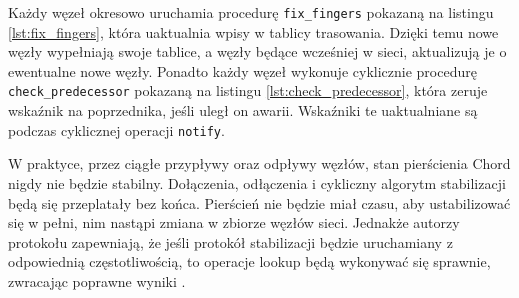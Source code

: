 \documentclass[12pt, twoside, openany]{report}
\begin{document}












Każdy węzeł okresowo uruchamia procedurę \texttt{fix\_fingers} pokazaną na listingu \ref{lst:fix_fingers}, która uaktualnia wpisy w tablicy trasowania. Dzięki temu nowe węzły wypełniają swoje tablice, a węzły będące wcześniej w sieci, aktualizują je o ewentualne nowe węzły. Ponadto każdy węzeł wykonuje cyklicznie procedurę \\\texttt{check\_predecessor} pokazaną na listingu \ref{lst:check_predecessor}, która zeruje wskaźnik na poprzednika, jeśli uległ on awarii. Wskaźniki te uaktualniane są podczas cyklicznej operacji \texttt{notify}.

W praktyce, przez ciągłe przypływy oraz odpływy węzłów, stan pierścienia Chord nigdy nie będzie stabilny. Dołączenia, odłączenia i cykliczny algorytm stabilizacji będą się przeplatały bez końca. Pierścień nie będzie miał czasu, aby ustabilizować się w pełni, nim nastąpi zmiana w zbiorze węzłów sieci. Jednakże autorzy protokołu zapewniają, że jeśli protokół stabilizacji będzie uruchamiany z odpowiednią częstotliwością, to operacje lookup będą wykonywać się sprawnie, zwracając poprawne wyniki \cite{bib:chord}.
\end{document}
